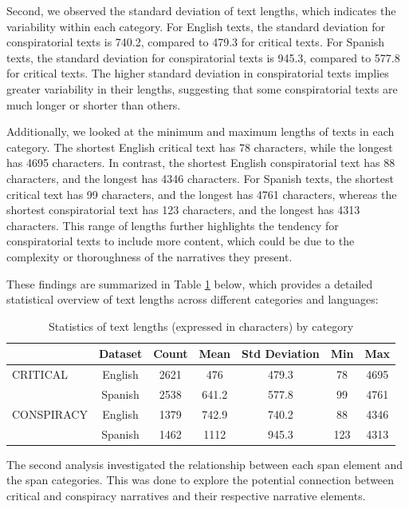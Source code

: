 \documentclass{Configuration_Files/PoliMi3i_thesis}
\begin{document}
Second, we observed the standard deviation of text lengths, which indicates the variability within each category. For English texts, the standard deviation for conspiratorial texts is 740.2, compared to 479.3 for critical texts. For Spanish texts, the standard deviation for conspiratorial texts is 945.3, compared to 577.8 for critical texts. The higher standard deviation in conspiratorial texts implies greater variability in their lengths, suggesting that some conspiratorial texts are much longer or shorter than others.

Additionally, we looked at the minimum and maximum lengths of texts in each category. The shortest English critical text has 78 characters, while the longest has 4695 characters. In contrast, the shortest English conspiratorial text has 88 characters, and the longest has 4346 characters. For Spanish texts, the shortest critical text has 99 characters, and the longest has 4761 characters, whereas the shortest conspiratorial text has 123 characters, and the longest has 4313 characters. This range of lengths further highlights the tendency for conspiratorial texts to include more content, which could be due to the complexity or thoroughness of the narratives they present.

These findings are summarized in Table \ref{tab:text_length} below, which provides a detailed statistical overview of text lengths across different categories and languages:

\begin{table}[H]
\centering
\small
\begin{tabular}{l|cccccc}
\hline
        & Dataset & Count & Mean & Std Deviation & Min & Max \\
\hline
CRITICAL & English & 2621 & 476 & 479.3 & 78 & 4695 \\
         & Spanish & 2538 & 641.2 & 577.8 & 99 & 4761 \\
\hline
CONSPIRACY & English & 1379 & 742.9 & 740.2 & 88 & 4346 \\
           & Spanish & 1462 & 1112 & 945.3 & 123 & 4313 \\
\hline
\end{tabular}
\caption{\small Statistics of text lengths (expressed in characters) by category}
\label{tab:text_length}
\end{table}
\FloatBarrier

The second analysis investigated the relationship between each span element and the span categories. This was done to explore the potential connection between critical and conspiracy narratives and their respective narrative elements.
\end{document}
